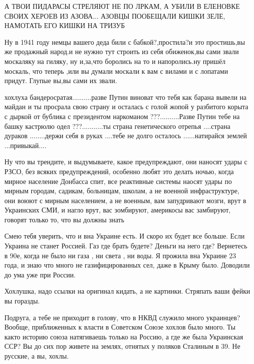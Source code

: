 А ТВОИ ПИДАРАСЫ СТРЕЛЯЮТ НЕ ПО ЛРКАМ, А УБИЛИ В ЕЛЕНОВКЕ СВОИХ ХЕРОЕВ ИЗ
АЗОВА... АЗОВЦЫ ПООБЕЩАЛИ КИШКИ ЗЕЛЕ, НАМОТАТЬ ЕГО КИШКИ НА ТРИЗУБ


Ну в 1941 году немцы вашего деда били с бабкой?,простила?и это простишь,вы же
продажный народ.и не нужно тут строить из себя обиженок,вы сами звали москаляку
на гиляку, ну и,за,что боролись на то и напоролись.ну пришёл москаль, что
теперь ,или вы думали москали к вам с вилами и с лопатами придут. Глупые вы,вы
сами их звали.

хохлуха бандеросратая..........разве Путин виноват что тебя как барана вывели
на майдан и ты просрала свою страну и осталась с голой жопой у разбитого корыта
с  дыркой  от  бублика  с президентом наркоманом ???..........Разве Путин тебе
на башку кастрюлю одел ???...........ты страна генетического отрепья ....страна
дураков ........держи себя в руках ....тебе не долго осталось ......натирайся
землей ...привыкай....

Ну что вы трендите, и выдумываете, какое предупреждают, они наносят удары с
РЗСО, без всяких предупреждений, особенно любят это делать ночью, когда мирное
население Донбасса спит, все реактивные системы наосят удары по мирным городам,
садикам, больницам, школам, а не военной инфраструктуре, они воюют с мирным
населением, а не военным, вам запудривают мозги, врут в Украинских СМИ, и нагло
врут, вас зомбируют, америкосы вас замбируют, говорят только то, что вы должны
знать


Смею тебя уверить, что и вна Украине есть. И скоро их будет все больше. Если
Украина не станет Россией. Газ где брать будете? Деньги на него где? Вернетесь
в 90е, когда не было ни газа , ни света , ни воды. Я прожила вна Украине 23
года, и знаю что много не газифицированных сел, даже в Крыму было. Доводили до
ума уже при России.


Хохлушка, надо ссылки на оригинал кидать, а не картинки. Стряпать ваши фейки вы
горазды.


Подруга, а тебе не приходит в голову, что в НКВД служило много украинцев?
Вообще, приближенных к власти в Советском Союзе хохлов было много. Ты както
историю союза натягиваешь только на Россию, а где же была Украинская ССР? Вы до
сих пор живете на землях, отнятых у поляков Сталиным в 39. Не русские, а вы,
хохлы.

